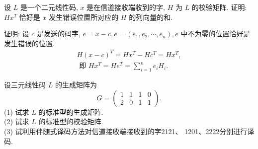 \begin{exercise}
设 $ L $ 是一个二元线性码, $ x $ 是在信道接收端收到的字, $ H $ 为 $ L $ 的校验矩阵. 证明: $ H x^{T} $ 恰好是 $ x $ 发生错误位置所对应的 $ H $ 的列向量的和.
\end{exercise}
\begin{solution}
    证明: 设 $ c $ 是发送的码字, $ e=x-c, e=\left(e_{1}, e_{2}, \cdots, e_{n}\right), e $ 中不为零的位置恰好是发生错误的位置.
$$
\begin{array}{l}
H(x-c)^{T}=H x^{T}-H c^{T}=H x^{T}, \\
\text { 即 } H x^{T}=H e^{T}=\sum\limits_{i=1}^{n} e_{i} H_{i} .
\end{array}
$$
\end{solution}

\begin{exercise}
设三元线性码 $ L $ 的生成矩阵为
$$
G=\left(\begin{array}{llll}
1 & 1 & 1 & 0 \\
2 & 0 & 1 & 1
\end{array}\right) .
$$
(1) 试求 $ L $ 的标准型的生成矩阵.\\
(2) 试求 $ L $ 的标准型的校验矩阵.\\
(3) 试利用伴随式译码方法对信道接收端接收到的字2121、 1201、2222分别进行译码.
\end{exercise}
